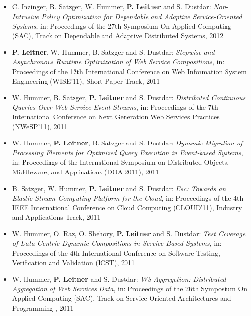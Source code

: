 \documentclass[paper=letter,fontsize=11pt]{scrartcl} %
\begin{document}
\begin{itemize}
{Cloud Applications}, in: Proceedings of the 27th Symposium On Applied Computing (SAC),
Track on Cloud Computing, 2012
\item C. Inzinger, B. Satzger, W. Hummer, \textbf{P. Leitner} and S. Dustdar:
\emph{Non-Intrusive Policy Optimization for Dependable and Adaptive Service-Oriented Systems}, in: Proceedings of the 27th Symposium On Applied Computing (SAC),
Track on Dependable and Adaptive Distributed Systems, 2012
\item \textbf{P. Leitner}, W. Hummer, B. Satzger and S. Dustdar:
\emph{Stepwise and Asynchronous Runtime Optimization of Web Service
Compositions}, in: Proceedings of the 12th International Conference on Web
Information System Engineering (WISE'11), Short Paper Track, 2011
\item W. Hummer, B. Satzger, \textbf{P. Leitner} and S. Dustdar:
\emph{Distributed Continuous Queries Over Web Service Event Streams}, in: Proceedings of the 7th International Conference on Next Generation Web Services Practices
(NWeSP'11), 2011
\item W. Hummer, \textbf{P. Leitner}, B. Satzger and S. Dustdar:
\emph{Dynamic Migration of Processing Elements for Optimized Query Execution in
Event-based Systems}, in: Proceedings of the International Symposium on Distributed
Objects, Middleware, and Applications (DOA 2011), 2011
\item B. Satzger, W. Hummer, \textbf{P. Leitner} and S. Dustdar:
\emph{Esc: Towards an Elastic Stream Computing Platform for the Cloud},
in: Proceedings of the 4th IEEE International Conference on Cloud Computing (CLOUD'11), Industry and Applications Track, 2011
\item W. Hummer, O. Raz, O. Shehory, \textbf{P. Leitner} and S. Dustdar:
\emph{Test Coverage of Data-Centric Dynamic Compositions in Service-Based
Systems}, in: Proceedings of the 4th International Conference on Software Testing,
Verification and Validation (ICST), 2011
\item W. Hummer, \textbf{P. Leitner} and S. Dustdar: \emph{WS-Aggregation: Distributed Aggregation of Web Services Data}, in: Proceedings of the 26th Symposium On Applied Computing (SAC), Track on Service-Oriented Architectures and Programming , 2011
\end{itemize}
\end{document}
